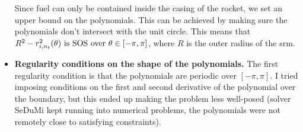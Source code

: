 \begin{itemize}
        Since fuel can only be contained inside the casing of the rocket,
        we set an upper bound on the polynomials. This can be achieved by making sure
        the polynomials don't intersect with the unit circle. This means that
        $R^2 - r^2_{i,n_t}(\theta) \rm{~is~SOS~over~} \theta \in [-\pi, \pi]$, where
        $R$ is the outer radius of the \gls{srm}.
        \item \textbf{Regularity conditions on the shape of the polynomials.}
        The first regularity condition is that the polynomials are periodic over $[-\pi, \pi]$.
        I tried imposing conditions on the first and second derivative of the polynomial over the boundary,
        but this ended up making the problem less well-posed (solver SeDuMi kept running
        into numerical problems, the polynomials were not remotely close to satisfying constraints).
    \end{itemize}

